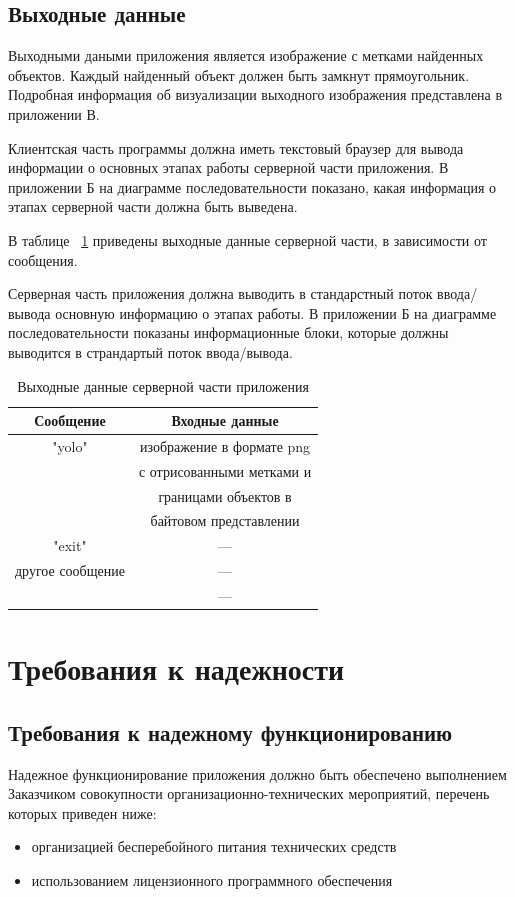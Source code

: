 \documentclass[a4paper,english]{G2-105}
\begin{document}
\subsection{Выходные данные} \ttl
\par Выходными даными приложения является изображение с метками найденных объектов. Каждый найденный объект должен быть замкнут прямоугольник. Подробная информация об визуализации выходного изображения представлена в приложении В.
\par Клиентская часть программы должна иметь текстовый браузер для вывода информации о основных этапах работы серверной части приложения. В приложении Б на диаграмме последовательности показано, какая информация о этапах серверной части должна быть выведена.
\par В таблице ~\ref{output} приведены выходные данные серверной части, в зависимости от сообщения.
\par Серверная часть приложения должна выводить в стандарстный поток ввода/вывода основную информацию о этапах работы. В приложении Б на диаграмме последовательности показаны информационные блоки, которые должны выводится в страндартый поток ввода/вывода.
\begin{longtable}{|c|c|}
    \caption{Выходные данные серверной части приложения} \label{output} \\ \hline
    Сообщение        & Входные данные            \\ \hline \endhead
    "yolo"           & изображение в формате png \\ 
                     & с отрисованными метками и \\
                     & границами объектов в      \\
                     & байтовом представлении    \\ \hline
    "exit"           & ---                       \\ \hline
    другое сообщение & ---                       \\  
    	                 & ---                       \\
\end{longtable}
\ttl
\section{Требования к надежности} \ttl
\subsection{Требования к надежному функционированию} \ttl
Надежное функционирование приложения должно быть обеспечено выполнением Заказчиком совокупности организационно-технических мероприятий, перечень которых приведен ниже:
\begin{itemize}
\item организацией бесперебойного питания технических средств
\item использованием лицензионного программного обеспечения
\end{itemize} \ttl
\end{document}
